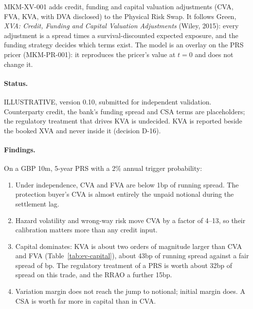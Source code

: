 \documentclass[11pt,a4paper]{article}
\begin{document}
\mkmtitlepage
\mkmlegalpage

\tableofcontents
\clearpage

\mkmexecsummary

MKM-XV-001 adds credit, funding and capital valuation adjustments (CVA, FVA,
KVA, with DVA disclosed) to the Physical Risk Swap. It follows Green,
\emph{XVA: Credit, Funding and Capital Valuation Adjustments} (Wiley, 2015):
every adjustment is a spread times a survival-discounted expected exposure,
and the funding strategy decides which terms exist. The model is an overlay on
the PRS pricer (MKM-PR-001): it reproduces the pricer's value at $t=0$ and does
not change it.

\paragraph{Status.} ILLUSTRATIVE, version 0.10, submitted for independent
validation. Counterparty credit, the bank's funding spread and CSA terms are
placeholders; the regulatory treatment that drives KVA is undecided. KVA is
reported beside the booked XVA and never inside it (decision D-16).

\paragraph{Findings.} On a GBP 10m, 5-year PRS with a 2\% annual trigger probability:
\begin{enumerate}[leftmargin=*]
\item Under independence, CVA and FVA are below 1bp of running spread. The
  protection buyer's CVA is almost entirely the unpaid notional during the
  settlement lag.
\item Hazard volatility and wrong-way risk move CVA by a factor of 4--13, so
  their calibration matters more than any credit input.
\item Capital dominates: KVA is about two orders of magnitude larger than CVA
  and FVA (Table~\ref{tab:ev-capital}), about 43bp of running spread against a
  fair spread of \evFair{}bp. The regulatory treatment of a PRS is worth about
  32bp of spread on this trade, and the RRAO a further 15bp.
\item Variation margin does not reach the jump to notional; initial margin
  does. A CSA is worth far more in capital than in CVA.
\end{enumerate}
\end{document}
